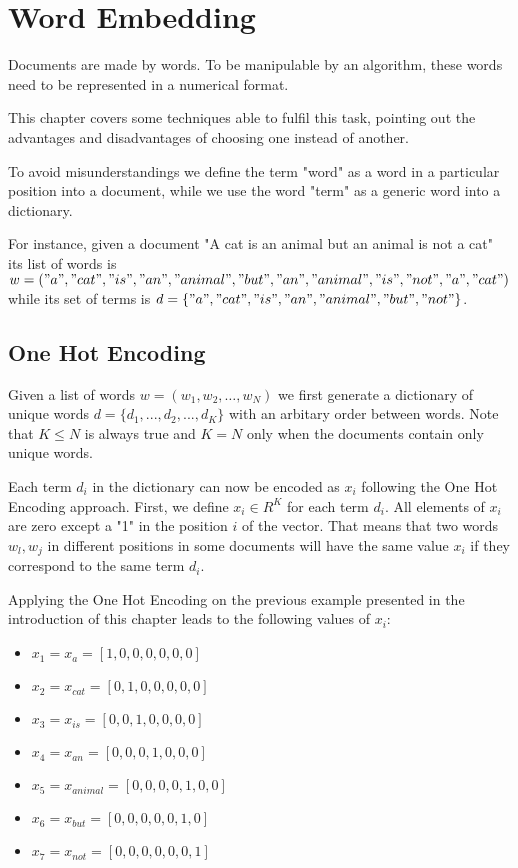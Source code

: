 \chapter{Word Embedding} \label{wordemb}
Documents are made by words.
To be manipulable by an algorithm, these words need to be represented in a numerical format.

This chapter covers some techniques able to fulfil this task,
pointing out the advantages and disadvantages of choosing one instead of another.

To avoid misunderstandings
we define the term "word" as a word in a particular position into a document,
while we use the word "term" as a generic word into a dictionary.

For instance, given a document "A cat is an animal but an animal is not a cat" its list of words
is $ w = ("a", "cat", "is", "an", "animal", "but", "an", "animal", "is", "not", "a", "cat")$
while its set of terms is $d = \{"a", "cat", "is", "an", "animal", "but", "not"\}$.

\section{One Hot Encoding}
Given a list of words $w = (w_1, w_2, \dots, w_N)$
we first generate a dictionary of unique words
$d = \{d_1, ..., d_2, ..., d_K\}$ with an arbitary order between words.
Note that $ K \leq N $ is always true and $ K = N $ only when the documents contain only unique words.

Each term $d_i$ in the dictionary can now be encoded as $x_i$ following the One Hot Encoding approach.
First, we define $x_i \in R^K$ for each term $d_i$. All elements of $x_i$ are zero except a "1" in the position  $i$ of the vector.
That means that two words $w_l, w_j$ in different positions in some documents will have the same value $x_i$ if they correspond to the same term $d_i$.

Applying the One Hot Encoding on the previous example presented in the introduction of this chapter leads to the following values of $x_i$:
\begin{itemize}
    \item $x_1 = x_{a} = [1, 0, 0, 0, 0, 0, 0]$
    \item $x_2 = x_{cat} = [0, 1, 0, 0, 0, 0, 0]$
    \item $x_3 = x_{is} = [0, 0, 1, 0, 0, 0, 0]$
    \item $x_4 = x_{an} = [0, 0, 0, 1, 0, 0, 0]$
    \item $x_5 = x_{animal} = [0, 0, 0, 0, 1, 0, 0]$
    \item $x_6 = x_{but} = [0, 0, 0, 0, 0, 1, 0]$
    \item $x_7 = x_{not} = [0, 0, 0, 0, 0, 0, 1]$
\end{itemize}

